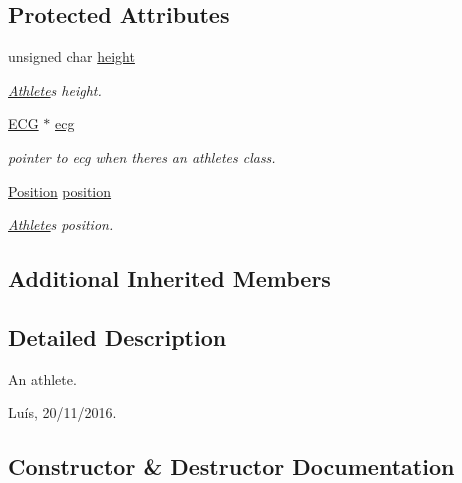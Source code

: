 \subsection*{Protected Attributes}
\begin{DoxyCompactItemize}
\item 
unsigned char \hyperlink{class_athlete_a80a64bb1d5c943aaa7ca152d596d9914}{height}
\begin{DoxyCompactList}\small\item\em \hyperlink{class_athlete}{Athlete}\textquotesingle{}s height. \end{DoxyCompactList}\item 
\hyperlink{class_e_c_g}{E\+CG} $\ast$ \hyperlink{class_athlete_aa9576b3d16acdbe4c6efaeed68f690d7}{ecg}
\begin{DoxyCompactList}\small\item\em pointer to ecg when there\textquotesingle{}s an athlete\textquotesingle{}s class. \end{DoxyCompactList}\item 
\hyperlink{_utils_8hpp_ab91b34ae619fcdfcba4522b4f335bf83}{Position} \hyperlink{class_athlete_ab6c8f0df2238999ed76e563510ac0b38}{position}
\begin{DoxyCompactList}\small\item\em \hyperlink{class_athlete}{Athlete}\textquotesingle{}s position. \end{DoxyCompactList}\end{DoxyCompactItemize}
\subsection*{Additional Inherited Members}


\subsection{Detailed Description}
An athlete. 

Luís, 20/11/2016. 

\subsection{Constructor \& Destructor Documentation}
\hypertarget{class_athlete_ae606aa946830e5ea0a05bf8f4fe22132}{}\label{class_athlete_ae606aa946830e5ea0a05bf8f4fe22132} 
